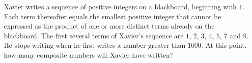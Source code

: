 Xavier writes a sequence of positive integers on a blackboard, beginning with $1$. Each term thereafter equals the smallest positive integer that cannot be expressed as the product of one or more distinct terms already on the blackboard. The first several terms of Xavier's sequence are $1$, $2$, $3$, $4$, $5$, $7$ and $9$. He stops writing when he first writes a number greater than $1000$. At this point, how many composite numbers will Xavier have written?
